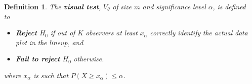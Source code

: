 \documentclass[12pt]{article}
\newcommand{\blue}[1]{{\color{blue} #1}} %
\newcommand{\red}[1]{{\color{red} #1}}
\newtheorem{dfn}{Definition}[section]
\begin{document}
\begin{table}[htp]
\caption{Possible $p$-values for different numbers of observers, $K$, for fixed size $m = 20$ lineups.}
\begin{center}
\end{center}
\label{pvalue}
\end{table}




\begin{dfn}\label{dfn:test}
The \textbf{visual test}, $V_{\theta}$  of  size $m$ and significance level $\alpha$, is defined to  
\begin{itemize}\itemsep-3pt
\item \textbf{Reject} $H_0$ if out of $K$ observers at least $x_{\alpha}$ correctly identify the actual data plot in the lineup, and
\item \textbf{Fail to reject} $H_0$  otherwise. 
\end{itemize}
where $x_{\alpha}$ is such that $P(X \ge x_{\alpha}) \le \alpha$. 
\end{dfn}
\end{document}
